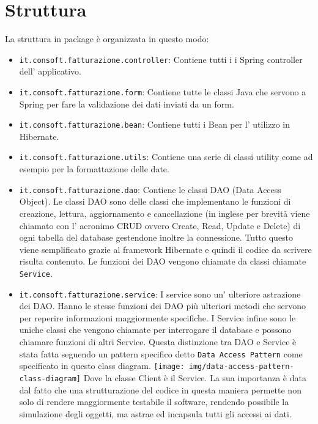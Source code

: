 \documentclass[12pt]{book}
\begin{document}
\section{Struttura}
La struttura in package è organizzata in questo modo:
\begin{itemize}
    \item \texttt{it.consoft.fatturazione.controller}: Contiene tutti i 
        i Spring controller dell' applicativo.
    \item \texttt{it.consoft.fatturazione.form}: Contiene tutte le classi Java 
        che servono a Spring per fare la validazione dei dati inviati da un 
        form\@. 
    \item \texttt{it.consoft.fatturazione.bean}: Contiene tutti i Bean per 
        l' utilizzo in Hibernate.     
    \item \texttt{it.consoft.fatturazione.utils}: Contiene una serie di classi
        utility come ad esempio per la formattazione delle date.
    \item \texttt{it.consoft.fatturazione.dao}: Contiene le classi DAO (Data
        Access Object). Le classi DAO sono delle classi che implementano 
        le funzioni di creazione, lettura, aggiornamento e cancellazione 
        (in inglese per brevità viene chiamato con l' acronimo CRUD ovvero
        Create, Read, Update e Delete) di ogni 
        tabella del database gestendone inoltre la connessione. 
        Tutto questo viene semplificato grazie al framework Hibernate e quindi 
        il codice da scrivere risulta contenuto.
        Le funzioni dei DAO vengono chiamate da classi chiamate 
        \texttt{Service}.
    \item \texttt{it.consoft.fatturazione.service}: I service sono un' ulteriore
        astrazione dei DAO\@. 
        Hanno le stesse funzioni dei DAO più ulteriori metodi che servono per 
        reperire informazioni maggiormente specifiche.
        I Service infine sono le uniche classi che vengono chiamate per 
        interrogare il database e possono chiamare funzioni di altri
        Service.
        Questa distinzione tra DAO e Service è stata fatta seguendo un 
        pattern specifico detto \texttt{Data Access Pattern} come specificato
        in questo class diagram.
        \newline
        \newline
        \texttt{[image: img/data-access-pattern-class-diagram]}
        \newline
        Dove la classe Client è il Service. 
        La sua importanza è data dal fatto che una strutturazione del codice 
        in questa maniera permette non solo di rendere maggiormente testabile 
        il software, rendendo possibile la simulazione degli oggetti, ma astrae 
        ed incapsula tutti gli accessi ai dati.
\end{itemize}
\end{document}
